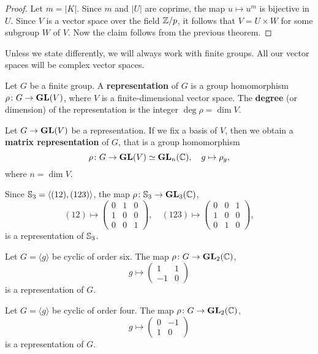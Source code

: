 \begin{proof}
    Let $m=|K|$. Since $m$ and $|U|$ are coprime, the map 
    $u\mapsto u^m$ is bijective in $U$. Since $V$ is a vector space over the field 
    $\mathbb{Z}/p$, it follows that $V=U\times W$ for some subgroup $W$ of $V$. Now the claim follows
    from the previous theorem. 
\end{proof}



Unless we state differently, we will always work
with finite groups. All our vector spaces will
be complex vector spaces. 

\begin{definition}
    Let $G$ be a finite group. A \textbf{representation}
    of $G$ is a group homomorphism $\rho\colon G\to\mathbf{GL}(V)$, where
    $V$ is a finite-dimensional vector space. The \textbf{degree} (or dimension) 
    of the representation is the integer $\deg\rho=\dim V$. 
\end{definition}

Let $G\to\mathbf{GL}(V)$ be a representation. 
If we fix a basis of $V$, then we obtain
a \textbf{matrix representation} of $G$, that is a 
group homomorphism 
\[
\rho\colon G\to\mathbf{GL}(V)\simeq\mathbf{GL}_n(\mathbb{C}),
\quad 
g\mapsto\rho_g,
\]
where
$n=\dim V$. 

\begin{example}
Since $\mathbb{S}_3=\langle (12),(123)\rangle$, the map $\rho\colon \mathbb{S}_3\to\mathbf{GL}_3(\mathbb{C})$,
\[
(12)\mapsto\begin{pmatrix}
0 & 1 & 0\\
1 & 0 & 0\\
0 & 0 & 1
\end{pmatrix},\quad
(123)\mapsto\begin{pmatrix}
0 & 0 & 1\\
1 & 0 & 0\\
0 & 1 & 0
\end{pmatrix},
\] 
is a representation of $\mathbb{S}_3$. 
\end{example}

\begin{example}
Let $G=\langle g\rangle$ be cyclic of order six. 
The map $\rho\colon G\to\mathbf{GL}_2(\mathbb{C})$, 
\[
g\mapsto
\begin{pmatrix}
1&1\\
-1&0
\end{pmatrix}
\] 
is a representation of $G$. 
\end{example}

\begin{example}
Let $G=\langle g\rangle$ be cyclic of order four. 
The map $\rho\colon G\to\mathbf{GL}_2(\mathbb{C})$, 
\[
g\mapsto
\begin{pmatrix}
0&-1\\
1&0
\end{pmatrix}
\] 
is a representation of $G$. 
\end{example}

